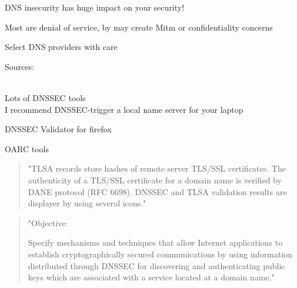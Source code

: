 \documentclass[20pt,landscape,a4paper,footrule]{foils}
\begin{document}

\begin{list1}
\item DNS insecurity has huge impact on your security!
\item Most are denial of service, by may create Mitm or confidentiality concerns
\item Select DNS providers with care
\end{list1}


Sources:\\
{\tiny
{}\\
}




Lots of DNSSEC tools\\
I recommend DNSSEC-trigger a local name server for your laptop

\begin{list2}
\item DNSSEC Validator for firefox\\ 
\item OARC tools 
\item {}
\end{list2}



\begin{quote}
"TLSA records store hashes of remote server TLS/SSL certificates. The authenticity of a TLS/SSL certificate for a domain name is verified by DANE protocol (RFC 6698). DNSSEC and TLSA validation results are displayer by using several icons."
\end{quote}



\begin{quote}
"Objective:

Specify mechanisms and techniques that allow Internet applications to
establish cryptographically secured communications by using information
distributed through DNSSEC for discovering and authenticating public
keys which are associated with a service located at a domain name."
\end{quote}
\end{document}
